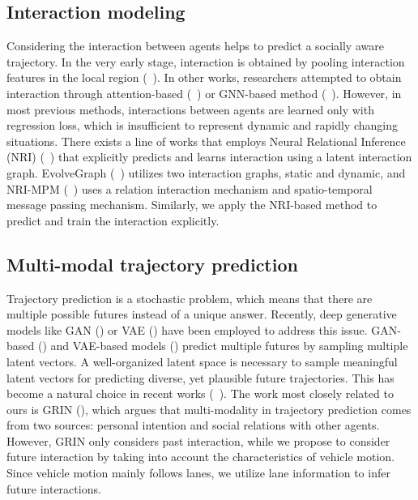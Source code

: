 \documentclass{article} \usepackage{iclr2023_conference,times}
\begin{document}
\subsection{Interaction modeling}
\label{sec:related_work_interaction_modeling}
Considering the interaction between agents helps to predict a socially aware trajectory.
In the very early stage, interaction is obtained by pooling interaction features in the local region (~\cite{deo2018convolutional, gupta2018social}).
In other works, researchers attempted to obtain interaction through attention-based (~\cite{ngiam2022scene, mercat2020multi, Vemula2018SocialAM}) or GNN-based method (~\cite{carrasco2021scout,  cao2021spectral, zeng2021lanercnn,casas2020implicit, liang2020learning,gao2020vectornet}).
However, in most previous methods, interactions between agents are learned only with regression loss, which is insufficient to represent dynamic and rapidly changing situations.
There exists a line of works that employs Neural Relational Inference (NRI) (~\cite{kipf2018neural}) that explicitly predicts and learns interaction using a latent interaction graph.
EvolveGraph (~\cite{li2020evolvegraph}) utilizes two interaction graphs, static and dynamic, and NRI-MPM (~\cite{chen2021neural}) uses a relation interaction mechanism and spatio-temporal message passing mechanism.
Similarly, we apply the NRI-based method to predict and train the interaction explicitly.

\subsection{Multi-modal trajectory prediction}
Trajectory prediction is a stochastic problem, which means that there are multiple possible futures instead of a unique answer.
Recently, deep generative models like GAN (\cite{goodfellow2014generative}) or VAE (\cite{kingma2013auto}) have been employed to address this issue.
GAN-based (\cite{gupta2018social,kosaraju2019social,li2021vehicle}) and VAE-based models (\cite{ivanovic2019trajectron,salzmann2020trajectron++,tang2019multiple}) predict multiple futures by sampling multiple latent vectors.
A well-organized latent space is necessary to sample meaningful latent vectors for predicting diverse, yet plausible future trajectories. 
This has become a natural choice in recent works (~\cite{ma2021likelihood, bae2022non}).
The work most closely related to ours is GRIN (\cite{li2021grin}), which argues that multi-modality in trajectory prediction comes from two sources: personal intention and social relations with other agents. 
However, GRIN only considers past interaction, while we propose to consider future interaction by taking into account the characteristics of vehicle motion. 
Since vehicle motion mainly follows lanes, we utilize lane information to infer future interactions.
\end{document}
